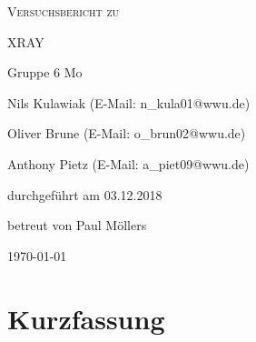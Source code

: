 \documentclass[
	a4paper,
	12pt,
	pagesize,
	ngerman
]{scrartcl}
\begin{document}
\begin{titlepage}
	\centering
	{\scshape\LARGE Versuchsbericht zu \par}
	\vspace{1cm}
	{\scshape\huge XRAY \par}
	\vspace{2.5cm}
	{\LARGE Gruppe 6 Mo\par}
	\vspace{0.5cm}
	{\large Nils Kulawiak (E-Mail: n\_kula01@wwu.de) \par}
	{\large Oliver Brune (E-Mail: o\_brun02@wwu.de) \par}
	{\large Anthony Pietz (E-Mail: a\_piet09@wwu.de) \par}
	\vfill
	durchgeführt am 03.12.2018\par
	
	\vfill
	betreut von Paul Möllers\par
	\vfill
	{\large \today\par}
\end{titlepage}

\tableofcontents
		
\newpage

\section{Kurzfassung}
\end{document}
